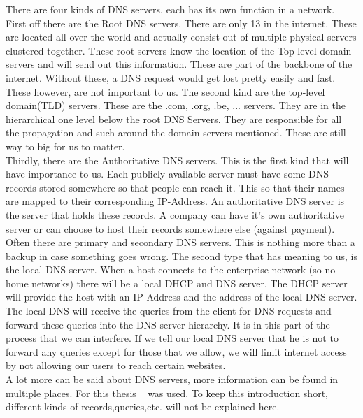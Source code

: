 There are four kinds of DNS servers, each has its own function in a network.\\
First off there are the Root DNS servers. There are only 13 in the internet. These are located all over the world and actually consist out of multiple physical servers clustered together. These root servers know the location of the Top-level domain servers and will send out this information. These are part of the backbone of the internet. Without these, a DNS request would get lost pretty easily and fast. These however, are not important to us. 
The second kind are the top-level domain(TLD) servers. These are the .com, .org, .be, ... servers. They are in the hierarchical  one level below the root DNS Servers. They are responsible for all the propagation and such around the domain servers mentioned. These are still way to big for us to matter.\\
Thirdly, there are the Authoritative DNS servers. This is the first kind that will have importance to us. Each publicly available server must have some DNS records stored somewhere so that people can reach it. This so that their names are mapped to their corresponding IP-Address. An authoritative DNS server is the server that holds these records. A company can have it's own authoritative server or can choose to host their records somewhere else (against payment). Often there are primary and secondary DNS servers. This is nothing more than a backup in case something goes wrong.
The second type that has meaning to us, is the local DNS server. When a host connects to the enterprise network (so no home networks) there will be a local DHCP and DNS server. The DHCP server will provide the host with an IP-Address and the address of the local DNS server. The local DNS will receive the queries from the client for DNS requests and forward these queries into the DNS server hierarchy. It is in this part of the process that we can interfere. If we tell our local DNS server that he is not to forward any queries except for those that we allow, we will limit internet access by not allowing our users to reach certain websites.\\
A lot more can be said about DNS servers, more information can be found in multiple places. For this thesis ~\textcite{NetworkingPearson} was used. To keep this introduction short, different kinds of records,queries,etc. will not be explained here.

